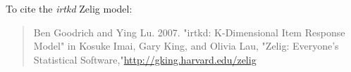 To cite the \emph{ irtkd } Zelig model:
 \begin{verse}
 Ben Goodrich and Ying Lu. 2007. "irtkd: K-Dimensional Item Response Model" in Kosuke Imai, Gary King, and Olivia Lau, "Zelig: Everyone's Statistical Software,"\url{http://gking.harvard.edu/zelig} 
\end{verse}